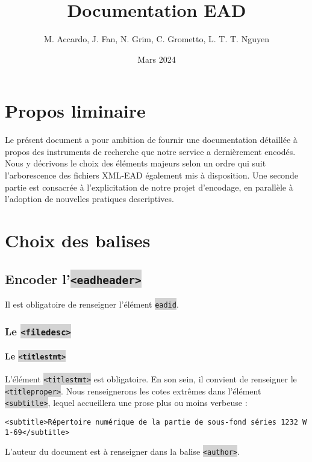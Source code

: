 \documentclass[hidelinks, 13pt]{report}
\title{Documentation EAD}
\date{Mars 2024}
\author{M. Accardo, J. Fan, N. Grim, C. Grometto, L. T. T. Nguyen}
\newcommand{\code}[1]{\colorbox{LightGray}{\texttt{#1}}}
\begin{document}
	
	\maketitle
	
	\tableofcontents
	
	\chapter{Propos liminaire}
	
	Le présent document a pour ambition de fournir une documentation détaillée à propos des instruments de recherche que notre service a dernièrement encodés. Nous y décrivons le choix des éléments majeurs selon un ordre qui suit l'arborescence des fichiers XML-EAD également mis à disposition. Une seconde partie est consacrée à l'explicitation de notre projet d'encodage, en parallèle à l'adoption de nouvelles pratiques descriptives.
	
	\chapter{Choix des balises}
	
	\section{Encoder l'\code{<eadheader>}}
	
	Il est obligatoire de renseigner l'élément \code{eadid}.
	
	\subsection{Le \code{<filedesc>}}
	
	\subsubsection{Le \code{<titlestmt>}}
	
	L'élément \code{<titlestmt>} est obligatoire. En son sein, il convient de renseigner le \code{<titleproper>}. Nous renseignerons les cotes extrêmes dans l'élément \code{<subtitle>}, lequel accueillera une prose plus ou moins verbeuse :
	
\begin{lstlisting}[language=EAD]
<subtitle>Répertoire numérique de la partie de sous-fond séries 1232 W 1-69</subtitle>
\end{lstlisting}	

	L'auteur du document est à renseigner dans la balise \code{<author>}.
\end{document}
